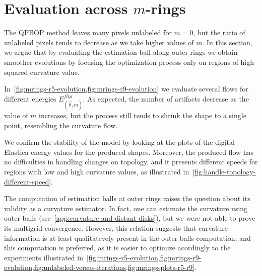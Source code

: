 \section{Evaluation across $m$-rings}
\label{ch7:sec:evaluation-across-rings}

The QPBOP method leaves many pixels unlabeled for $m=0$, but the ratio of unlabeled pixels tends to decrease as we take higher values of $m$. In this section, we argue that by evaluating the estimation ball along outer rings we obtain smoother evolutions by focusing the optimization process only on regions of high squared curvature value.

In~\cref{fig:mrings-r5-evolution,fig:mrings-r9-evolution} we evaluate several flows for different energies $E_{(\vec{\theta},m)}^{flip}$. As expected, the number of artifacts decrease as the value of $m$ increases, but the process still tends to shrink the shape to a single point, resembling the curvature flow. 

We confirm the stability of the model by looking at the plots of the digital Elastica energy values for the produced shapes. Moreover, the produced flow has no difficulties in handling changes on topology, and it presents different speeds for regions with low and high curvature values, as illustrated in~\cref{fig:handle-topology-different-speed}.

The computation of estimation balls at outer rings raises the question about its validity as a curvature estimator. In fact, one can estimate the curvature using outer balls (see~\cref{app:curvature-and-distant-disks}), but we were not able to prove its multigrid convergence. However, this relation suggests that curvature information is at least qualitatevely present in the outer balls computation, and this computation is preferred, as it is easier to optimize acordingly to the experiments illustrated in~\cref{fig:mrings-r5-evolution,fig:mrings-r9-evolution,fig:unlabeled-versus-iterations,fig:mrings-plots-r5-r9}.

